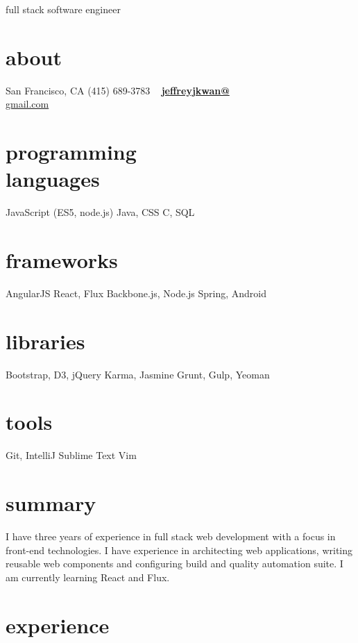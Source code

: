 \documentclass[print]{friggeri-cv}
\begin{document}
       {full stack software engineer}


\begin{aside}
  \section{about}
    San Francisco, CA
    (415) 689-3783
    ~
    \href{mailto:jeffreyjkwan@gmail.com}{\textbf{jeffreyjkwan@}\\gmail.com}
  \section{programming\\languages}
    JavaScript
    (ES5, node.js)
    Java, CSS
    C, SQL
  \section{frameworks}
    AngularJS
    React, Flux
    Backbone.js, Node.js
    Spring, Android
  \section{libraries}
    Bootstrap, D3, jQuery
    Karma, Jasmine
    Grunt, Gulp, Yeoman
  \section{tools}
    Git, IntelliJ
    Sublime Text
    Vim
\end{aside}

\section{summary}

I have three years of experience in full stack web development with a focus in front-end technologies. I have experience in architecting web applications, writing reusable web components and configuring build and quality automation suite. I am currently learning React and Flux.
\\
\section{experience}
\end{document}
